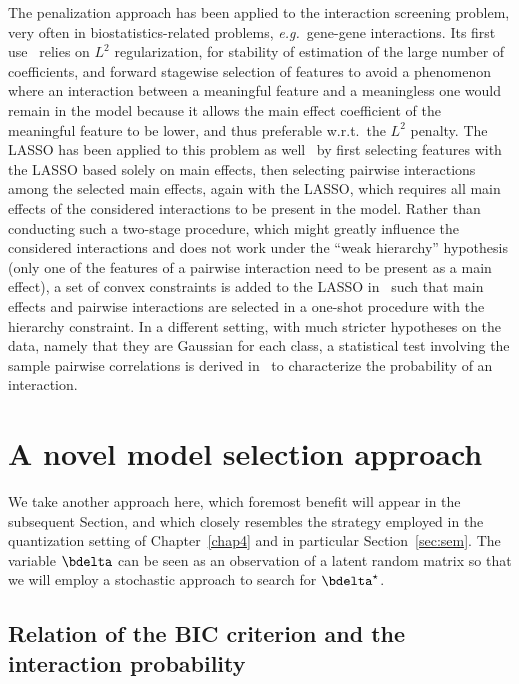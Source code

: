 The penalization approach has been applied to the interaction screening problem, very often in biostatistics-related problems, \textit{e.g.}\ gene-gene interactions. Its first use~\cite{park2007penalized} relies on $L^2$ regularization, for stability of estimation of the large number of coefficients, and forward stagewise selection of features to avoid a phenomenon where an interaction between a meaningful feature and a meaningless one would remain in the model because it allows the main effect coefficient of the meaningful feature to be lower, and thus preferable w.r.t.\ the $L^2$ penalty. The LASSO has been applied to this problem as well~\cite{wu2009genome} by first selecting features with the LASSO based solely on main effects, then selecting pairwise interactions among the selected main effects, again with the LASSO, which requires all main effects of the considered interactions to be present in the model. Rather than conducting such a two-stage procedure, which might greatly influence the considered interactions and does not work under the ``weak hierarchy'' hypothesis (only one of the features of a pairwise interaction need to be present as a main effect), a set of convex constraints is added to the LASSO in~\cite{bien2013lasso} such that main effects and pairwise interactions are selected in a one-shot procedure with the hierarchy constraint. In a different setting, with much stricter hypotheses on the data, namely that they are Gaussian for each class, a statistical test involving the sample pairwise correlations is derived in~\cite{simon} to characterize the probability of an interaction.


\section{A novel model selection approach}

We take another approach here, which foremost benefit will appear in the subsequent Section, and which closely resembles the strategy employed in the quantization setting of Chapter~\ref{chap4} and in particular Section~\ref{sec:sem}. The variable $\bdelta$ can be seen as an observation of a latent random matrix so that we will employ a stochastic approach to search for $\bdelta^\star$.

\subsection{Relation of the BIC criterion and the interaction probability}

